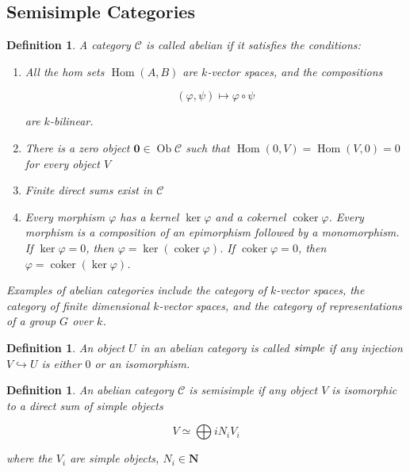\documentclass[]{article}
\newtheorem{defn}[theorem]{Definition}
\newcommand{\Hom}{\operatorname{Hom}}
\newcommand{\coker}{\operatorname{coker}}
\newcommand{\Ob}{\operatorname{Ob}}
\numberwithin{equation}{subsection}
\begin{document}
\subsection{Semisimple Categories}
\begin{defn}
    A category $\mathcal{C}$ is called \emph{abelian} if it satisfies the conditions:

    \begin{enumerate}
    \renewcommand{\labelenumi}{\roman{enumi})}
        \item All the hom sets $\Hom(A,B)$ are $k$-vector spaces, and the compositions
            
            \begin{equation}
                (\varphi, \psi) \mapsto \varphi \circ \psi
            \end{equation}

            are $k$-bilinear.
        \item There is a zero object $\mathbf{0} \in \Ob \mathcal{C}$ such that $\Hom(0,V) = \Hom(V,0) = 0$ for every object $V$
        \item Finite direct sums exist in $\mathcal{C}$
        \item Every morphism $\varphi$ has a kernel $\ker \varphi$ and a
            cokernel $\coker \varphi$. Every morphism is a composition of an
            epimorphism followed by a monomorphism. If $\ker \varphi = 0$, then
            $\varphi = \ker(\coker \varphi)$. If $\coker \varphi = 0$, then
            $\varphi = \coker(\ker \varphi)$.
    \end{enumerate}

    Examples of abelian categories include the category of $k$-vector spaces,
    the category of finite dimensional $k$-vector spaces, and the category of
    representations of a group $G$ over $k$.

\end{defn}

\begin{defn}
    An object $U$ in an abelian category is called $\emph{simple}$ if any
    injection $V \hookrightarrow U$ is either $0$ or an isomorphism.
\end{defn}

\begin{defn}
    An abelian category $\mathcal{C}$ is \emph{semisimple} if any object $V$ is isomorphic to a direct sum of simple objects

    \begin{equation}
        V \simeq \bigoplus{i} N_i V_i
    \end{equation}

    where the $V_i$ are simple objects, $N_i \in \mathbf{N}$

\end{defn}
\end{document}
